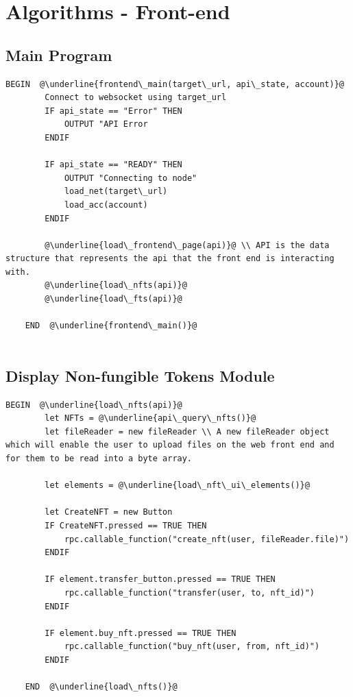 \section{Algorithms - Front-end}

\subsection{Main Program}

\begin{lstlisting}[caption=Main Program, escapechar=\@]
	BEGIN  @\underline{frontend\_main(target\_url, api\_state, account)}@
		Connect to websocket using target_url
		IF api_state == "Error" THEN
			OUTPUT "API Error
		ENDIF

		IF api_state == "READY" THEN
			OUTPUT "Connecting to node"
			load_net(target\_url)
			load_acc(account)
		ENDIF

		@\underline{load\_frontend\_page(api)}@ \\ API is the data structure that represents the api that the front end is interacting with.
		@\underline{load\_nfts(api)}@
		@\underline{load\_fts(api)}@

	END  @\underline{frontend\_main()}@
			
\end{lstlisting}
\subsection{Display Non-fungible Tokens Module}

\begin{lstlisting}[caption=Load NFTs, escapechar=\@]
	BEGIN  @\underline{load\_nfts(api)}@
		let NFTs = @\underline{api\_query\_nfts()}@
		let fileReader = new fileReader \\ A new fileReader object which will enable the user to upload files on the web front end and for them to be read into a byte array.

		let elements = @\underline{load\_nft\_ui\_elements()}@

		let CreateNFT = new Button
		IF CreateNFT.pressed == TRUE THEN
			rpc.callable_function("create_nft(user, fileReader.file)")
		ENDIF

		IF element.transfer_button.pressed == TRUE THEN
			rpc.callable_function("transfer(user, to, nft_id)")
		ENDIF

		IF element.buy_nft.pressed == TRUE THEN
			rpc.callable_function("buy_nft(user, from, nft_id)")
		ENDIF

	END  @\underline{load\_nfts()}@
\end{lstlisting}


\vfill{}
